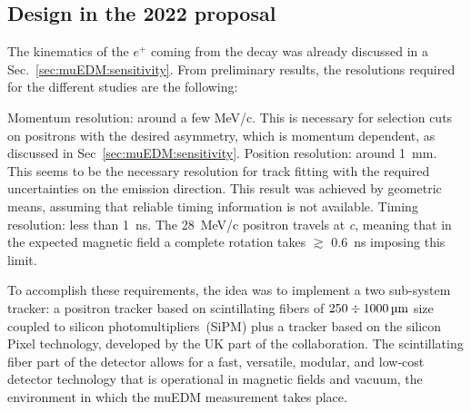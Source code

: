 \begin{refsection}
\section{Design in the 2022 proposal}
\label{sec:muEDM:proposal}
    The kinematics of the $e^+$ coming from the decay was already discussed in a Sec.~\ref{sec:muEDM:sensitivity}.
    From preliminary results, the resolutions required for the different studies are the following:
    \begin{outline}
        \1 Momentum resolution: around a few MeV/c. 
        This is necessary for selection cuts on positrons with the desired asymmetry, which is momentum dependent, as discussed in Sec~\ref{sec:muEDM:sensitivity}.
        \1 Position resolution: around \SI{1}{mm}. This seems to be the necessary resolution for track fitting with the required uncertainties on the emission direction. 
        This result was achieved by geometric means, assuming that reliable timing information is not available. 
        \1 Timing resolution: less than \SI{1}{ns}. The \SI{28}{MeV/c} positron travels at \textit{c}, meaning that in the expected magnetic field a complete rotation takes $\gtrsim$ \SI{0.6}{ns} imposing this limit. 
    \end{outline}
    \noindent
    To accomplish these requirements, the idea was to implement a two sub-system tracker: a positron tracker based on scintillating fibers of $250\divisionsymbol\SI{1000}{\micro\meter}$ size coupled to silicon photomultipliers~(SiPM) plus a tracker based on the silicon Pixel technology, developed by the UK part of the collaboration.  
    The scintillating fiber part of the detector allows for a fast, versatile, modular, and low-cost detector technology that is operational in magnetic fields and vacuum, the environment in which the muEDM measurement takes place.
    

\end{refsection}
